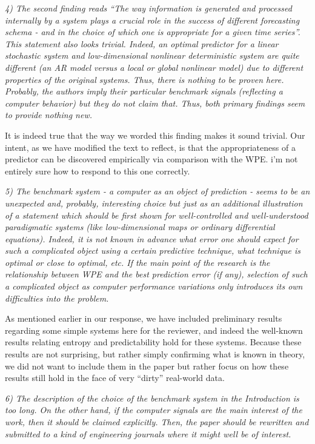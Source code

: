 \documentclass[12pt]{article}
\newcommand{\alert}[1]{{\color{red}#1}}
\begin{document}
\emph{4) The second finding reads ``The way information is generated and
processed internally by a system plays a crucial role in the success of
different forecasting schema - and in the choice of which one is appropriate for
a given time series''. This statement also looks trivial. Indeed, an optimal
predictor for a linear stochastic system and low-dimensional nonlinear
deterministic system are quite different (an AR model versus a local or global
nonlinear model) due to different properties of the original systems. Thus,
there is nothing to be proven here. Probably, the authors imply their particular
benchmark signals (reflecting a computer behavior) but they do not claim that.
Thus, both primary findings seem to provide nothing new.}

It is indeed true that the way we worded this finding makes it sound trivial.
Our intent, as we have modified the text to reflect, is that the appropriateness
of a predictor can be discovered empirically via comparison with the WPE.
\alert{i'm not entirely sure how to respond to this one correctly.}

\emph{5) The benchmark system - a computer as an object of prediction - seems to
be an unexpected and, probably, interesting choice but just as an additional
illustration of a statement which should be first shown for well-controlled and
well-understood paradigmatic systems (like low-dimensional maps or ordinary
differential equations). Indeed, it is not known in advance what error one
should expect for such a complicated object using a certain predictive
technique, what technique is optimal or close to optimal, etc. If the main point
of the research is the relationship between WPE and the best prediction error
(if any), selection of such a complicated object as computer performance
variations only introduces its own difficulties into the problem.}

As mentioned earlier in our response, we have included preliminary results
regarding some simple systems here for the reviewer, and indeed the well-known
results relating entropy and predictability hold for these systems. Because
these results are not surprising, but rather simply confirming what is known in
theory, we did not want to include them in the paper but rather focus on how
these results still hold in the face of very ``dirty'' real-world data.

\emph{6) The description of the choice of the benchmark system in the
Introduction is too long. On the other hand, if the computer signals are the
main interest of the work, then it should be claimed explicitly. Then, the paper
should be rewritten and submitted to a kind of engineering journals where it
might well be of interest.}
\end{document}
